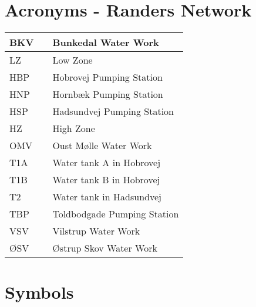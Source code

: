 \section*{Acronyms - Randers Network}
	
	\begin{tabular}{|l c l|} \hline
		BKV     &&	Bunkedal Water Work 									\\ \hline
		LZ      &&	Low Zone												\\ \hline
		HBP     &&	Hobrovej Pumping Station 								\\ \hline
		HNP     &&	Hornbæk Pumping Station 								\\ \hline
		HSP 	&&	Hadsundvej Pumping Station 								\\ \hline		
		HZ      &&	High Zone												\\ \hline
		OMV		&&	Oust Mølle Water Work 									\\ \hline
		T1A 	&&	Water tank A in Hobrovej 								\\ \hline
		T1B 	&&	Water tank B in Hobrovej 								\\ \hline
		T2 		&&	Water tank in Hadsundvej 								\\ \hline
		TBP 	&&	Toldbodgade Pumping Station 							\\ \hline
		VSV 	&&	Vilstrup Water Work 									\\ \hline
		ØSV 	&&	Østrup Skov Water Work 									\\ \hline
	\end{tabular}

\newpage

\section*{Symbols}



